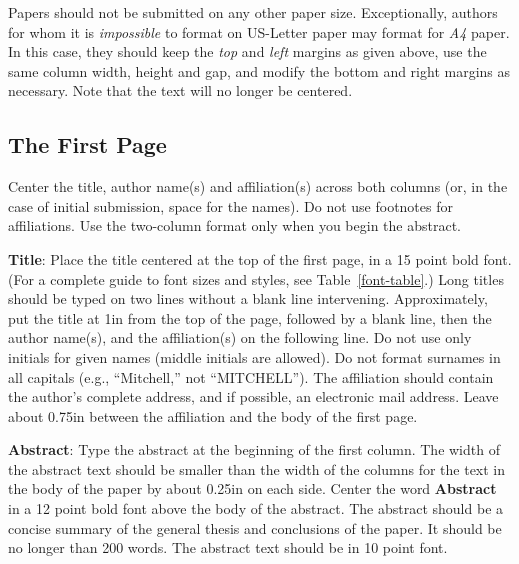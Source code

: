 \documentclass[11pt,letterpaper]{article}
\begin{document}
\noindent Papers should not be submitted on any other paper size. Exceptionally,
authors for whom it is \emph{impossible} to format on US-Letter paper 
may format for \emph{A4} paper. In this case, they should keep the \emph{top}
and \emph{left} margins as given above, use the same column width,
height and gap, and modify the bottom and right margins as necessary.
Note that the text will no longer be centered.

\subsection{The First Page}
\label{ssec:first}

Center the title, author name(s) and affiliation(s) across both
columns (or, in the case of initial submission, space for the names). 
Do not use footnotes for affiliations.  
Use the two-column format only when you begin the abstract.

{\bf Title}: Place the title centered at the top of the first page, in
a 15 point bold font.  (For a complete guide to font sizes and styles, see Table~\ref{font-table}.)
Long titles should be typed on two lines without
a blank line intervening. Approximately, put the title at 1in from the
top of the page, followed by a blank line, then the author name(s),
and the affiliation(s) on the following line.  Do not use only initials
for given names (middle initials are allowed). Do not format surnames
in all capitals (e.g., ``Mitchell,'' not ``MITCHELL'').  The affiliation should
contain the author's complete address, and if possible, an electronic
mail address. Leave about 0.75in between the affiliation and the body
of the first page.

{\bf Abstract}: Type the abstract at the beginning of the first
column.  The width of the abstract text should be smaller than the
width of the columns for the text in the body of the paper by about
0.25in on each side.  Center the word {\bf Abstract} in a 12 point
bold font above the body of the abstract. The abstract should be a
concise summary of the general thesis and conclusions of the paper.
It should be no longer than 200 words.  The abstract text should be in 10 point font.
\end{document}
